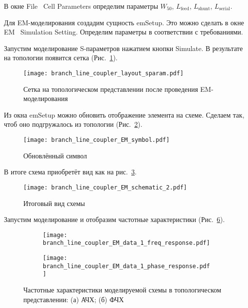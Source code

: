 В окне File \textrightarrow\ Cell Parameters определим параметры $W_{50}$, $L_\text{feed}$, $L_\text{shunt}$, $L_\text{serial}$.

Для EM-моделирования создадим сущность emSetup.
Это можно сделать в окне EM \textrightarrow\ Simulation Setting.
Определим параметры в соответствии с требованиями.

Запустим моделирование S-параметров нажатием кнопки Simulate.
В результате на топологии появится сетка (Рис.~\ref{fig:branch_line_coupler_layout_sparam}).

\begin{figure}
    \centering
    \texttt{[image: branch\_line\_coupler\_layout\_sparam.pdf]}
    \caption{Сетка на топологическом представлении после проведения EM-моделирования}%
    \label{fig:branch_line_coupler_layout_sparam}
\end{figure}

Из окна emSetup можно обновить отображение элемента на схеме.
Сделаем так, чтоб оно подгружалось из топологии (Рис.~\ref{fig:branch_line_coupler_EM_symbol}).
\begin{figure}
    \centering
    \texttt{[image: branch\_line\_coupler\_EM\_symbol.pdf]}
    \caption{Обновлённый символ}%
    \label{fig:branch_line_coupler_EM_symbol}
\end{figure}
В итоге схема приобретёт вид как на рис.~\ref{fig:branch_line_coupler_EM_schematic_2}.
\begin{figure}
    \centering
    \texttt{[image: branch\_line\_coupler\_EM\_schematic\_2.pdf]}
    \caption{Итоговый вид схемы}%
    \label{fig:branch_line_coupler_EM_schematic_2}
\end{figure}

Запустим моделирование и отобразим частотные характеристики (Рис.~\ref{fig:branch_line_coupler_EM_data_1}).

\begin{figure}[!ht]
    \centering
    \begin{subfigure}[b]{0.45\textwidth}
        \centering
        \texttt{[image: branch\_line\_coupler\_EM\_data\_1\_freq\_response.pdf]}
        \caption{}%
    \label{fig:branch_line_coupler_EM_data_1_freq_response}
    \end{subfigure}
    \hfill
    \begin{subfigure}[b]{0.45\textwidth}
        \centering
        \texttt{[image: branch\_line\_coupler\_EM\_data\_1\_phase\_response.pdf]}
        \caption{}%
    \label{fig:branch_line_coupler_EM_data_1_phase_response}
    \end{subfigure}
    \caption{%
        Частотные характеристики моделируемой схемы в топологическом представлении:
        (а) АЧХ;
        (б) ФЧХ
    }%
    \label{fig:branch_line_coupler_EM_data_1}
\end{figure}

